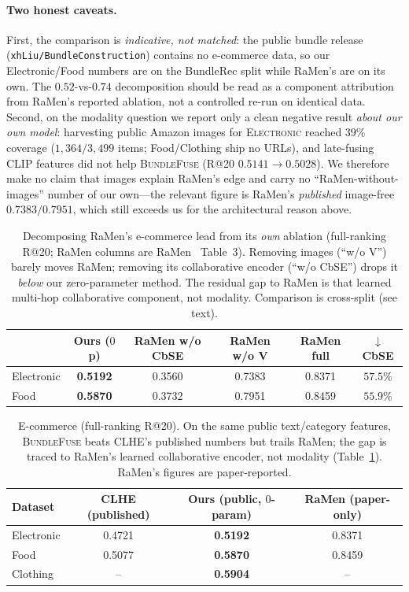 \paragraph{Two honest caveats.} First, the comparison is \emph{indicative, not matched}: the public bundle release
(\texttt{xhLiu/BundleConstruction}) contains no e-commerce data, so our Electronic/Food numbers are on the BundleRec
split while RaMen's are on its own. The $0.52$-vs-$0.74$ decomposition should be read as a component attribution from
RaMen's reported ablation, not a controlled re-run on identical data. Second, on the modality question we report only
a clean negative result \emph{about our own model}: harvesting public Amazon images for \textsc{Electronic} reached
$39\%$ coverage ($1{,}364/3{,}499$ items; Food/Clothing ship no URLs), and late-fusing CLIP features did not help
\textsc{BundleFuse} (R@20 $0.5141\!\to\!0.5028$). We therefore make no claim that images explain RaMen's edge and
carry no ``RaMen-without-images'' number of our own---the relevant figure is RaMen's \emph{published} image-free
$0.7383/0.7951$, which still exceeds us for the architectural reason above.

\begin{table}[t]\centering\small
\caption{Decomposing RaMen's e-commerce lead from its \emph{own} ablation (full-ranking R@20; RaMen columns are
RaMen~\cite{ramen} Table~3). Removing images (``w/o V'') barely moves RaMen; removing its collaborative encoder
(``w/o CbSE'') drops it \emph{below} our zero-parameter method. The residual gap to RaMen is that learned multi-hop
collaborative component, not modality. Comparison is cross-split (see text).}
\label{tab:ramen_abl}
\setlength{\tabcolsep}{4pt}
\begin{tabular}{lccccc}
\toprule
 & \textbf{Ours ($0$p)} & RaMen w/o CbSE & RaMen w/o V & RaMen full & $\downarrow$CbSE \\
\midrule
Electronic & \textbf{0.5192} & 0.3560 & 0.7383 & 0.8371 & $57.5\%$ \\
Food       & \textbf{0.5870} & 0.3732 & 0.7951 & 0.8459 & $55.9\%$ \\
\bottomrule
\end{tabular}
\end{table}

\begin{table}[t]\centering\small
\caption{E-commerce (full-ranking R@20). On the same public text/category features, \textsc{BundleFuse} beats CLHE's
published numbers but trails RaMen; the gap is traced to RaMen's learned collaborative encoder, not modality
(Table~\ref{tab:ramen_abl}). RaMen's figures are paper-reported.}
\label{tab:ecom}
\begin{tabular}{lccc}
\toprule
Dataset & CLHE (published) & \textbf{Ours (public, $0$-param)} & RaMen (paper-only) \\
\midrule
Electronic & 0.4721 & \textbf{0.5192} & 0.8371 \\
Food       & 0.5077 & \textbf{0.5870} & 0.8459 \\
Clothing   & --     & \textbf{0.5904} & -- \\
\bottomrule
\end{tabular}
\end{table}

